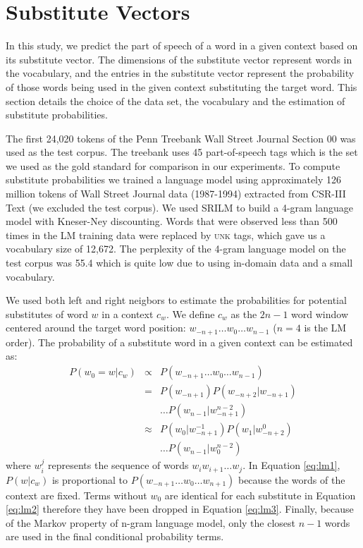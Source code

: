 \section{Substitute Vectors}
\label{sec:lm}

In this study, we predict the part of speech of a word in a given
context based on its substitute vector.  The dimensions of the
substitute vector represent words in the vocabulary, and the entries
in the substitute vector represent the probability of those words
being used in the given context substituting the target word.  This
section details the choice of the data set, the vocabulary and the
estimation of substitute probabilities.

The first 24,020 tokens of the Penn Treebank \cite{treebank3} Wall
Street Journal Section 00 was used as the test corpus.
The treebank uses 45 part-of-speech tags which is the set we used as
the gold standard for comparison in our experiments.
To compute substitute probabilities we trained a language model using
approximately 126 million tokens of Wall Street Journal data
(1987-1994) extracted from CSR-III Text \cite{csr3text} (we excluded
the test corpus).
We used SRILM \cite{Stolcke2002} to build a 4-gram language model with
Kneser-Ney discounting.
Words that were observed less than 500 times in the LM training data
were replaced by \textsc{unk} tags, which gave us a vocabulary size of
12,672.  
The perplexity of the 4-gram language model on the test corpus was
55.4 which is quite low due to using in-domain data and a small
vocabulary.

We used both left and right neigbors to estimate the probabilities for
potential substitutes of word $w$ in a context $c_w$.  We define $c_w$
as the $2n-1$ word window centered around the target word position:
$w_{-n+1} \ldots w_0 \ldots w_{n-1}$ ($n=4$ is the LM order).  The
probability of a substitute word in a given context can be estimated
as:
\begin{eqnarray}
  \label{eq:lm1}P(w_0 = w | c_w) & \propto & P(w_{-n+1}\ldots w_0\ldots w_{n-1})\\
  \label{eq:lm2}& = & P(w_{-n+1})P(w_{-n+2}|w_{-n+1})\nonumber\\
  &&\ldots P(w_{n-1}|w_{-n+1}^{n-2})\\
  \label{eq:lm3}& \approx & P(w_0| w_{-n+1}^{-1})P(w_{1}|w_{-n+2}^0)\nonumber\\
  &&\ldots P(w_{n-1}|w_0^{n-2})
\end{eqnarray}
where $w_i^j$ represents the sequence of words $w_i w_{i+1} \ldots
w_{j}$.  In Equation \ref{eq:lm1}, $P(w|c_w)$ is proportional to
$P(w_{-n+1}\ldots w_0 \ldots w_{n+1})$ because the words of the
context are fixed.  Terms without $w_0$ are identical for each
substitute in Equation \ref{eq:lm2} therefore they have been dropped
in Equation \ref{eq:lm3}.  Finally, because of the Markov property of
n-gram language model, only the closest $n-1$ words are used in the
final conditional probability terms.


